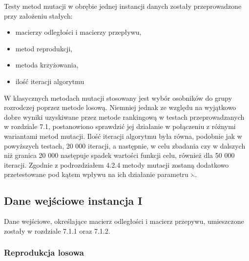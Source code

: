 Testy metod mutacji  w obrębie jednej instancji danych zostały przeprowadzone przy założeniu stałych:
\begin{itemize}
\item
macierzy odległości i macierzy przepływu,
\item
metod reprodukcji,
\item
metoda krzyżowania,
\item
ilość iteracji algorytmu
\end{itemize}
\par
W klasycznych metodach mutacji stosowany jest wybór osobników do grupy rozrodczej poprzez metode losową. Niemniej jednak ze względu na wyjątkowo dobre wyniki uzyskiwane przez metode rankingową w testach przeprowadzanych w rozdziale 7.1, postanowiono sprawdzić jej działanie w połączeniu z różnymi wariantami metod mutacji. Ilość iteracji algorytmu była równa, podobnie jak w powyższych testach, 20 000 iteracji, a następnie, w celu zbadania czy w dalszych niż granica 20 000 następuje spadek wartości funkcji celu, również dla 50 000 iteracji. Zgodnie z podrozdziałem 4.2.4 metody mutacji zostaną dodatkowo przetestowane pod kątem wpływu na ich działanie parametru $\leftthreetimes$.

\subsection{Dane wejściowe instancja I}
Dane wejściowe, określające macierz odległości i macierz przepywu, umieszczone zostały w rozdziale 7.1.1 oraz 7.1.2.
\subsubsection{Reprodukcja losowa}

